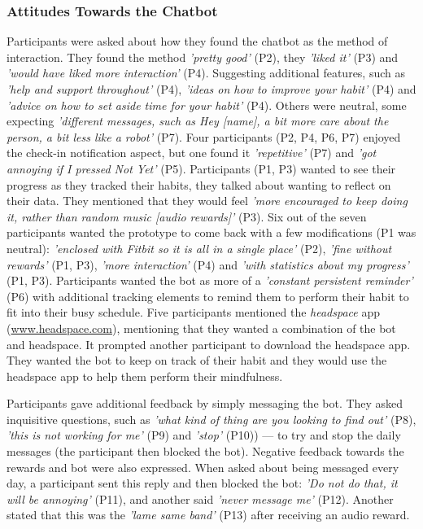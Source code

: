 \documentclass{scaffold/sigchi}
\begin{document}
\subsubsection{Attitudes Towards the Chatbot}
Participants were asked about how they found the chatbot as the method of interaction. They found the method \textit{'pretty good'} (P2), they \textit{'liked it'} (P3) and \textit{'would have liked more interaction'} (P4). Suggesting additional features, such as \textit{'help and support throughout'} (P4), \textit{'ideas on how to improve your habit'} (P4) and \textit{'advice on how to set aside time for your habit'} (P4). Others were neutral, some expecting \textit{'different messages, such as Hey [name], a bit more care about the person, a bit less like a robot'} (P7). Four participants (P2, P4, P6, P7) enjoyed the check-in notification aspect, but one found it \textit{'repetitive'} (P7) and \textit{'got annoying if I pressed Not Yet'} (P5). Participants (P1, P3) wanted to see their progress as they tracked their habits, they talked about wanting to reflect on their data. They mentioned that they would feel \textit{'more encouraged to keep doing it, rather than random music [audio rewards]'} (P3). Six out of the seven participants wanted the prototype to come back with a few modifications (P1 was neutral): \textit{'enclosed with Fitbit so it is all in a single place'} (P2), \textit{'fine without rewards'} (P1, P3), \textit{'more interaction'} (P4) and \textit{'with statistics about my progress'} (P1, P3). Participants wanted the bot as more of a \textit{'constant persistent reminder'} (P6) with additional tracking elements to remind them to perform their habit to fit into their busy schedule. Five participants mentioned the \textit{headspace} app (\url{www.headspace.com}), mentioning that they wanted a combination of the bot and headspace. It prompted another participant to download the headspace app. They wanted the bot to keep on track of their habit and they would use the headspace app to help them perform their mindfulness.

Participants gave additional feedback by simply messaging the bot. They asked inquisitive questions, such as \textit{'what kind of thing are you looking to find out'} (P8), \textit{'this is not working for me'} (P9) and \textit{'stop'} (P10)) --- to try and stop the daily messages (the participant then blocked the bot). Negative feedback towards the rewards and bot were also expressed. When asked about being messaged every day, a participant sent this reply and then blocked the bot: \textit{'Do not do that, it will be annoying'} (P11), and another said \textit{'never message me'} (P12). Another stated that this was the \textit{'lame same band'} (P13) after receiving an audio reward.
\end{document}
